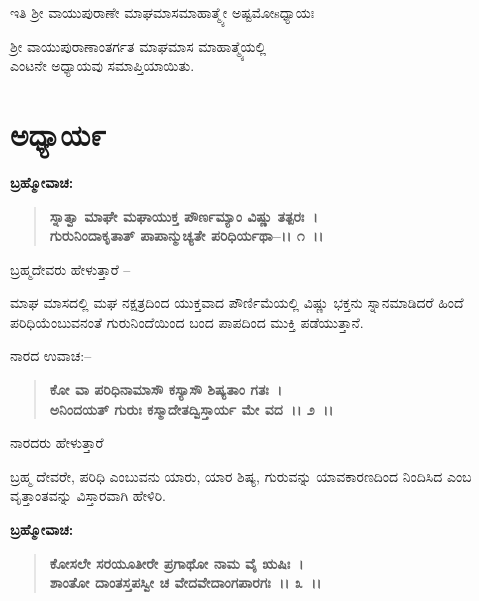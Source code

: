 \begin{center}
ಇತಿ ಶ‍್ರೀ ವಾಯುಪುರಾಣೇ ಮಾಘಮಾಸಮಾಹಾತ್ಮ್ಯೇ ಅಷ್ಟಮೋsಧ್ಯಾಯಃ
\end{center}

\begin{center}
 ಶ‍್ರೀ ವಾಯುಪುರಾಣಾಂತರ್ಗತ ಮಾಘಮಾಸ ಮಾಹಾತ್ಮ್ಯೆಯಲ್ಲಿ \\ ಎಂಟನೇ ಅಧ್ಯಾಯವು ಸಮಾಪ್ತಿಯಾಯಿತು.
\end{center}

\newpage

\section*{ಅಧ್ಯಾಯ೯}

\emptypage

\begin{flushleft}
\textbf{ಬ್ರಹ್ಮೋವಾಚ: }
\end{flushleft}

\begin{verse}
\textbf{ಸ್ನಾತ್ವಾ ಮಾಘೇ ಮಘಾಯುಕ್ತ ಪೌರ್ಣಮ್ಯಾಂ ವಿಷ್ಣು ತತ್ಪರಃ~।}\\\textbf{ಗುರುನಿಂದಾಕೃತಾತ್ ಪಾಪಾನ್ಮುಚ್ಯತೇ ಪರಿಧಿರ್ಯಥಾ–।। ೧~।।}
\end{verse}

\begin{flushleft}
ಬ್ರಹ್ಮದೇವರು ಹೇಳುತ್ತಾರೆ –
\end{flushleft}

ಮಾಘ ಮಾಸದಲ್ಲಿ ಮಘ ನಕ್ಷತ್ರದಿಂದ ಯುಕ್ತವಾದ ಪೌರ್ಣಿಮೆಯಲ್ಲಿ ವಿಷ್ಣು ಭಕ್ತನು ಸ್ನಾನಮಾಡಿದರೆ ಹಿಂದೆ ಪರಿಧಿಯೆಂಬುವನಂತೆ ಗುರುನಿಂದೆಯಿಂದ ಬಂದ ಪಾಪದಿಂದ ಮುಕ್ತಿ ಪಡೆಯುತ್ತಾನೆ. 

\noindent
ನಾರದ ಉವಾಚ:–

\begin{verse}
\textbf{ಕೋ ವಾ ಪರಿಧಿನಾಮಾಸೌ ಕಸ್ಯಾಸೌ ಶಿಷ್ಯತಾಂ ಗತಃ~।}\\\textbf{ಅನಿಂದಯತ್ ಗುರುಃ ಕಸ್ಮಾದೇತದ್ವಿಸ್ತಾರ್ಯ ಮೇ ವದ~।। ೨~।। }
\end{verse}

\begin{flushleft}
ನಾರದರು ಹೇಳುತ್ತಾರೆ
\end{flushleft}

ಬ್ರಹ್ಮ ದೇವರೇ, ಪರಿಧಿ ಎಂಬುವನು ಯಾರು, ಯಾರ ಶಿಷ್ಯ, ಗುರುವನ್ನು ಯಾವ\break ಕಾರಣದಿಂದ ನಿಂದಿಸಿದ ಎಂಬ ವೃತ್ತಾಂತವನ್ನು ವಿಸ್ತಾರವಾಗಿ ಹೇಳಿರಿ.

\begin{flushleft}
\textbf{ಬ್ರಹ್ಮೋವಾಚ: }
\end{flushleft}

\begin{verse}
\textbf{ಕೋಸಲೇ ಸರಯೂತೀರೇ ಪ್ರಗಾಥೋ ನಾಮ ವೈ ಋಷಿಃ~।}\\\textbf{ಶಾಂತೋ ದಾಂತಸ್ತಪಸ್ವೀ ಚ ವೇದವೇದಾಂಗಪಾರಗಃ~।। ೩~।।}
\end{verse}

